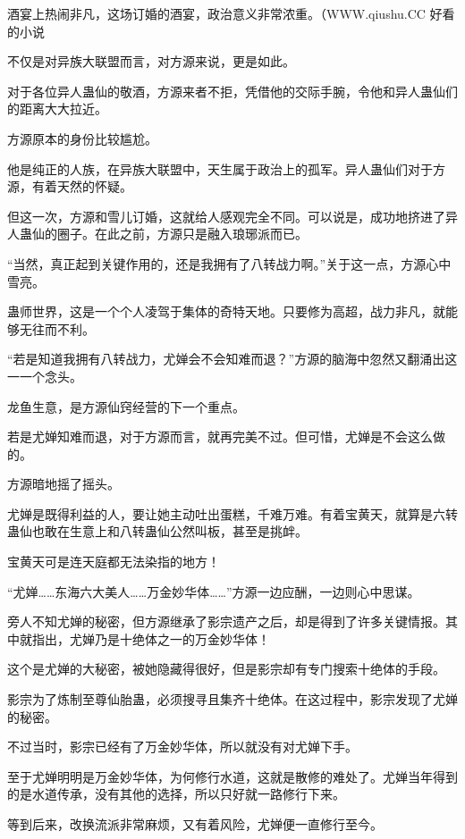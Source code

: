 
\begin{this_body}

酒宴上热闹非凡，这场订婚的酒宴，政治意义非常浓重。（WWW.qiushu.CC 好看的小说

不仅是对异族大联盟而言，对方源来说，更是如此。

对于各位异人蛊仙的敬酒，方源来者不拒，凭借他的交际手腕，令他和异人蛊仙们的距离大大拉近。

方源原本的身份比较尴尬。

他是纯正的人族，在异族大联盟中，天生属于政治上的孤军。异人蛊仙们对于方源，有着天然的怀疑。

但这一次，方源和雪儿订婚，这就给人感观完全不同。可以说是，成功地挤进了异人蛊仙的圈子。在此之前，方源只是融入琅琊派而已。

“当然，真正起到关键作用的，还是我拥有了八转战力啊。”关于这一点，方源心中雪亮。

蛊师世界，这是一个个人凌驾于集体的奇特天地。只要修为高超，战力非凡，就能够无往而不利。

“若是知道我拥有八转战力，尤婵会不会知难而退？”方源的脑海中忽然又翻涌出这一一个念头。

龙鱼生意，是方源仙窍经营的下一个重点。

若是尤婵知难而退，对于方源而言，就再完美不过。但可惜，尤婵是不会这么做的。

方源暗地摇了摇头。

尤婵是既得利益的人，要让她主动吐出蛋糕，千难万难。有着宝黄天，就算是六转蛊仙也敢在生意上和八转蛊仙公然叫板，甚至是挑衅。

宝黄天可是连天庭都无法染指的地方！

“尤婵……东海六大美人……万金妙华体……”方源一边应酬，一边则心中思谋。

旁人不知尤婵的秘密，但方源继承了影宗遗产之后，却是得到了许多关键情报。其中就指出，尤婵乃是十绝体之一的万金妙华体！

这个是尤婵的大秘密，被她隐藏得很好，但是影宗却有专门搜索十绝体的手段。

影宗为了炼制至尊仙胎蛊，必须搜寻且集齐十绝体。在这过程中，影宗发现了尤婵的秘密。

不过当时，影宗已经有了万金妙华体，所以就没有对尤婵下手。

至于尤婵明明是万金妙华体，为何修行水道，这就是散修的难处了。尤婵当年得到的是水道传承，没有其他的选择，所以只好就一路修行下来。

等到后来，改换流派非常麻烦，又有着风险，尤婵便一直修行至今。


\end{this_body}
